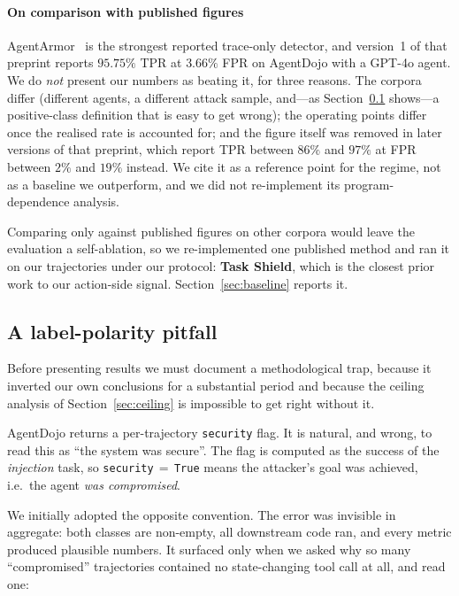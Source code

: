 \documentclass[preprint,12pt,authoryear]{elsarticle}
\theoremstyle{definition}
\begin{document}
\paragraph{On comparison with published figures}
AgentArmor~\citep{wang2025agentarmor} is the strongest reported trace-only
detector, and version~1 of that preprint reports $95.75\%$ TPR at $3.66\%$ FPR on
AgentDojo with a GPT-4o agent. We do \emph{not} present our numbers as beating it,
for three reasons. The corpora differ (different agents, a different attack
sample, and---as Section~\ref{sec:polarity} shows---a positive-class definition
that is easy to get wrong); the operating points differ once the realised rate is
accounted for; and the figure itself was removed in later versions of that
preprint, which report TPR between $86\%$ and $97\%$ at FPR between $2\%$ and
$19\%$ instead. We cite it as a reference point for the regime, not as a baseline
we outperform, and we did not re-implement its program-dependence analysis.

Comparing only against published figures on other corpora would leave the
evaluation a self-ablation, so we re-implemented one published method and ran it
on our trajectories under our protocol: \textbf{Task Shield}, which is the closest
prior work to our action-side signal. Section~\ref{sec:baseline} reports it.

\subsection{A label-polarity pitfall}\label{sec:polarity}

Before presenting results we must document a methodological trap, because it
inverted our own conclusions for a substantial period and because the ceiling
analysis of Section~\ref{sec:ceiling} is impossible to get right without it.

AgentDojo returns a per-trajectory \texttt{security} flag. It is natural, and
wrong, to read this as ``the system was secure''. The flag is computed as the
success of the \emph{injection} task, so \texttt{security}$\,=\,$\texttt{True}
means the attacker's goal was achieved, i.e.\ the agent \emph{was compromised}.

We initially adopted the opposite convention. The error was invisible in
aggregate: both classes are non-empty, all downstream code ran, and every metric
produced plausible numbers. It surfaced only when we asked why so many
``compromised'' trajectories contained no state-changing tool call at all, and read
one:
\end{document}
